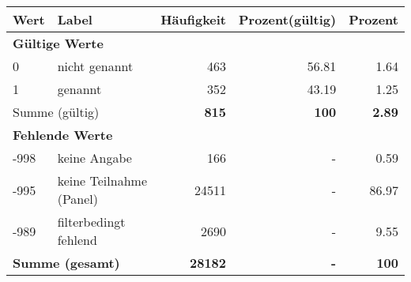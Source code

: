      \begin{longtable}{lXrrr}
     \toprule
     \textbf{Wert} & \textbf{Label} & \textbf{Häufigkeit} & \textbf{Prozent(gültig)} & \textbf{Prozent} \\
     \endhead
     \midrule
     \multicolumn{5}{l}{\textbf{Gültige Werte}}\\

     0 &
     \multicolumn{1}{X}{ nicht genannt   } &


       \num{463} &
       \num[round-mode=places,round-precision=2]{56.81} &
         \num[round-mode=places,round-precision=2]{1.64} \\

     1 &
     \multicolumn{1}{X}{ genannt   } &


       \num{352} &
       \num[round-mode=places,round-precision=2]{43.19} &
         \num[round-mode=places,round-precision=2]{1.25} \\
     \midrule
     \multicolumn{2}{l}{Summe (gültig)} &
       \textbf{\num{815}} &
     \textbf{100} &
       \textbf{\num[round-mode=places,round-precision=2]{2.89}} \\
     \multicolumn{5}{l}{\textbf{Fehlende Werte}}\\
       -998 &
       keine Angabe &
         \num{166} &
        - &
         \num[round-mode=places,round-precision=2]{0.59} \\
       -995 &
       keine Teilnahme (Panel) &
         \num{24511} &
        - &
         \num[round-mode=places,round-precision=2]{86.97} \\
       -989 &
       filterbedingt fehlend &
         \num{2690} &
        - &
         \num[round-mode=places,round-precision=2]{9.55} \\
     \midrule
     \multicolumn{2}{l}{\textbf{Summe (gesamt)}} &
          \textbf{\num{28182}} &
        \textbf{-} &
        \textbf{100} \\
     \bottomrule
     \end{longtable}
     
